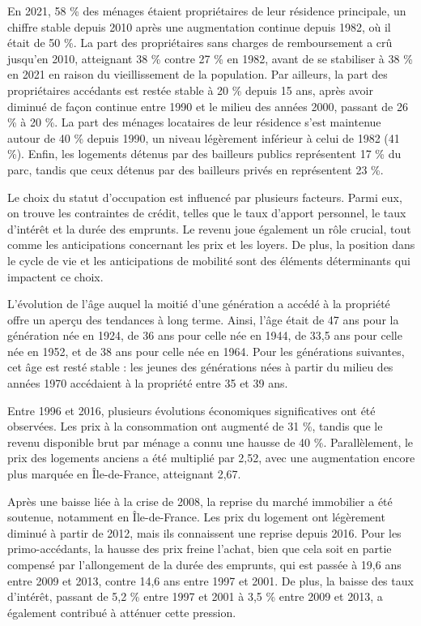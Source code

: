 \documentclass[a4paper, 12pt]{report}
\begin{document}
En 2021, 58 \% des ménages étaient propriétaires de leur résidence principale, un chiffre stable depuis 2010 après une augmentation continue depuis 1982, où il était de 50 \%. La part des propriétaires sans charges de remboursement a crû jusqu’en 2010, atteignant 38 \% contre 27 \% en 1982, avant de se stabiliser à 38 \% en 2021 en raison du vieillissement de la population. Par ailleurs, la part des propriétaires accédants est restée stable à 20 \% depuis 15 ans, après avoir diminué de façon continue entre 1990 et le milieu des années 2000, passant de 26 \% à 20 \%. La part des ménages locataires de leur résidence s'est maintenue autour de 40 \% depuis 1990, un niveau légèrement inférieur à celui de 1982 (41 \%). Enfin, les logements détenus par des bailleurs publics représentent 17 \% du parc, tandis que ceux détenus par des bailleurs privés en représentent 23 \%.

Le choix du statut d’occupation est influencé par plusieurs facteurs. Parmi eux, on trouve les contraintes de crédit, telles que le taux d’apport personnel, le taux d’intérêt et la durée des emprunts. Le revenu joue également un rôle crucial, tout comme les anticipations concernant les prix et les loyers. De plus, la position dans le cycle de vie et les anticipations de mobilité sont des éléments déterminants qui impactent ce choix.

L’évolution de l’âge auquel la moitié d’une génération a accédé à la propriété offre un aperçu des tendances à long terme. Ainsi, l'âge était de 47 ans pour la génération née en 1924, de 36 ans pour celle née en 1944, de 33,5 ans pour celle née en 1952, et de 38 ans pour celle née en 1964. Pour les générations suivantes, cet âge est resté stable : les jeunes des générations nées à partir du milieu des années 1970 accédaient à la propriété entre 35 et 39 ans.

Entre 1996 et 2016, plusieurs évolutions économiques significatives ont été observées. Les prix à la consommation ont augmenté de 31 \%, tandis que le revenu disponible brut par ménage a connu une hausse de 40 \%. Parallèlement, le prix des logements anciens a été multiplié par 2,52, avec une augmentation encore plus marquée en Île-de-France, atteignant 2,67.

Après une baisse liée à la crise de 2008, la reprise du marché immobilier a été soutenue, notamment en Île-de-France. Les prix du logement ont légèrement diminué à partir de 2012, mais ils connaissent une reprise depuis 2016. Pour les primo-accédants, la hausse des prix freine l’achat, bien que cela soit en partie compensé par l’allongement de la durée des emprunts, qui est passée à 19,6 ans entre 2009 et 2013, contre 14,6 ans entre 1997 et 2001. De plus, la baisse des taux d’intérêt, passant de 5,2 \% entre 1997 et 2001 à 3,5 \% entre 2009 et 2013, a également contribué à atténuer cette pression.
\end{document}
